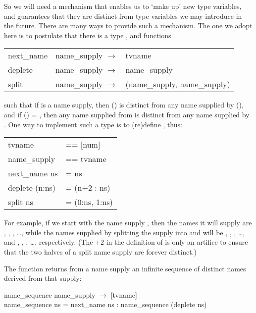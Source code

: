 So we will need a mechanism that enables us to `make up' new type
variables, and guarantees that they are distinct from type variables we may
introduce in the future. There are many ways to provide such a mechanism.
The one we adopt here is to postulate that there is a type , and
functions
\begin{mlcoded}
    \begin{tabular}{lll}
    next\_name &\hastype{} name\_supply $\rightarrow$ &tvname \\
    deplete   &\hastype{} name\_supply $\rightarrow$ &name\_supply \\
    split     &\hastype{} name\_supply $\rightarrow$ &(name\_supply, name\_supply)
    \end{tabular}
\end{mlcoded}
such that if  is a name supply, then () is distinct from any name
supplied by (), and if () = , then any name supplied
from  is distinct from any name supplied by . One way to implement
such a type is to (re)define , thus:
\begin{mlcoded}
    \begin{tabular}{ll}
        tvname       &== [num] \\
        name\_supply  &== tvname \\
        next\_name ns &= ns \\
        deplete (n:ns) &= (n+2 : ns) \\
        split ns       &= (0:ns, 1:ns)
    \end{tabular}
\end{mlcoded}
For example, if we start with the name supply \ml{[0]}, then the names it will supply
are \ml{[0]}, \ml{[2]}, \ml{[4]}, \ldots, while the names supplied by splitting the supply into
\ml{[0,0]} and \ml{[1,0]} will be \ml{[0,0]}, \ml{[2,0]}, \ml{[4,0]}, \ldots, and \ml{[1,0]}, \ml{[3,0]}, \ml{[5,0]}, \ldots,
respectively. (The $+2$ in the definition of  is only an artifice to ensure that the
two halves of a split name supply are forever distinct.)

The function  returns from a name supply an infinite
sequence of distinct names derived from that supply:
\begin{mlcoded}
    name\_sequence \hastype{} name\_supply $\rightarrow$ [tvname] \\
    name\_sequence ns = next\_name ns : name\_sequence (deplete ns)
\end{mlcoded}

